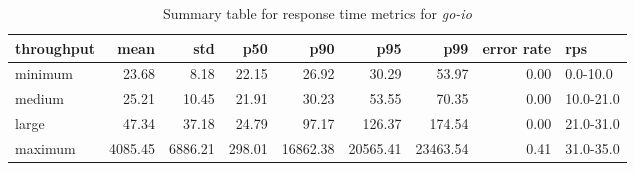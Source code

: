 \begin{table}[h]
\centering
\caption{Summary table for response time metrics for \textit{go-io}}
\label{tab:summary_table_go-io}
\begin{tabular}{lrrrrrrrl}
\toprule
throughput & mean & std & p50 & p90 & p95 & p99 & error rate & rps \\
\midrule
minimum & 23.68 & 8.18 & 22.15 & 26.92 & 30.29 & 53.97 & 0.00 & 0.0-10.0 \\
medium & 25.21 & 10.45 & 21.91 & 30.23 & 53.55 & 70.35 & 0.00 & 10.0-21.0 \\
large & 47.34 & 37.18 & 24.79 & 97.17 & 126.37 & 174.54 & 0.00 & 21.0-31.0 \\
maximum & 4085.45 & 6886.21 & 298.01 & 16862.38 & 20565.41 & 23463.54 & 0.41 & 31.0-35.0 \\
\bottomrule
\end{tabular}
\end{table}
